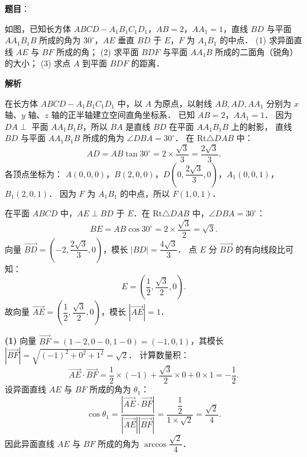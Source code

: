 \begin{answer}

\textbf{题目}：

如图，已知长方体 $ABCD - A_1B_1C_1D_1$，$AB = 2$，$AA_1 = 1$，直线 $BD$ 与平面 $AA_1B_1B$ 所成的角为 $30^\circ$，$AE$ 垂直 $BD$ 于 $E$，$F$ 为 $A_1B_1$ 的中点．
(1) 求异面直线 $AE$ 与 $BF$ 所成的角；
(2) 求平面 $BDF$ 与平面 $AA_1B$ 所成的二面角（锐角）的大小；
(3) 求点 $A$ 到平面 $BDF$ 的距离．
\nopagebreak[4]
\begin{center}\end{center}
\nopagebreak[4]
\textbf{解析}

在长方体 $ABCD - A_1B_1C_1D_1$ 中，以 $A$ 为原点，以射线 $AB, AD, AA_1$ 分别为 $x$ 轴、$y$ 轴、$z$ 轴的正半轴建立空间直角坐标系．
已知 $AB = 2$，$AA_1 = 1$．
因为 $DA \perp$ 平面 $AA_1B_1B$，所以 $BA$ 是直线 $BD$ 在平面 $AA_1B_1B$ 上的射影，
直线 $BD$ 与平面 $AA_1B_1B$ 所成的角为 $\angle DBA = 30^\circ$．
在 $\mathrm{Rt}\triangle DAB$ 中：
\nopagebreak[4]
\[
AD = AB \tan 30^\circ = 2 \times \dfrac{\sqrt{3}}{3} = \dfrac{2\sqrt{3}}{3}.
\]
各顶点坐标为：
$A(0, 0, 0)$，$B(2, 0, 0)$，$D\left(0, \dfrac{2\sqrt{3}}{3}, 0\right)$，$A_1(0, 0, 1)$，$B_1(2, 0, 1)$．
因为 $F$ 为 $A_1B_1$ 的中点，所以 $F(1, 0, 1)$．

在平面 $ABCD$ 中，$AE \perp BD$ 于 $E$．在 $\mathrm{Rt}\triangle DAB$ 中，$\angle DBA = 30^\circ$：
\nopagebreak[4]
\[
BE = AB \cos 30^\circ = 2 \times \dfrac{\sqrt{3}}{2} = \sqrt{3}.
\]
向量 $\vec{BD} = \left(-2, \dfrac{2\sqrt{3}}{3}, 0\right)$，模长 $|BD| = \dfrac{4\sqrt{3}}{3}$．
点 $E$ 分 $\vec{BD}$ 的有向线段比可知：
\nopagebreak[4]
\[
E = \left(\dfrac{1}{2}, \dfrac{\sqrt{3}}{2}, 0\right).
\]
故向量 $\vec{AE} = \left(\dfrac{1}{2}, \dfrac{\sqrt{3}}{2}, 0\right)$，模长 $|\vec{AE}| = 1$．

\textbf{(1)}
向量 $\vec{BF} = (1 - 2, 0 - 0, 1 - 0) = (-1, 0, 1)$，其模长 $|\vec{BF}| = \sqrt{(-1)^2 + 0^2 + 1^2} = \sqrt{2}$．
计算数量积：
\nopagebreak[4]
\[
\vec{AE} \cdot \vec{BF} = \dfrac{1}{2} \times (-1) + \dfrac{\sqrt{3}}{2} \times 0 + 0 \times 1 = -\dfrac{1}{2}.
\]
设异面直线 $AE$ 与 $BF$ 所成的角为 $\theta_1$：
\nopagebreak[4]
\[
\cos\theta_1 = \dfrac{|\vec{AE} \cdot \vec{BF}|}{|\vec{AE}||\vec{BF}|} = \dfrac{\dfrac{1}{2}}{1 \times \sqrt{2}} = \dfrac{\sqrt{2}}{4}.
\]
因此异面直线 $AE$ 与 $BF$ 所成的角为 $\arccos\dfrac{\sqrt{2}}{4}$．


\end{answer}
